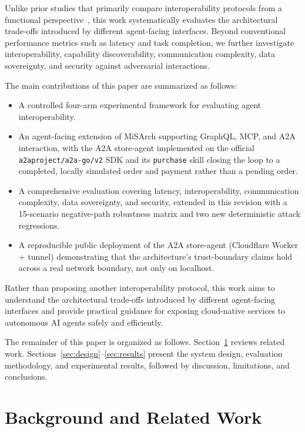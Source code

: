 \documentclass[conference]{IEEEtran}
\begin{document}
Unlike prior studies that primarily compare interoperability protocols from a
functional perspective~\cite{ref2,ref3}, this work systematically evaluates
the architectural trade-offs introduced by different agent-facing interfaces.
Beyond conventional performance metrics such as latency and task completion,
we further investigate interoperability, capability discoverability,
communication complexity, data sovereignty, and security against adversarial
interactions.

The main contributions of this paper are summarized as follows:
\begin{itemize}
\item A controlled four-arm experimental framework for evaluating agent
  interoperability.
\item An agent-facing extension of MiSArch supporting GraphQL, MCP, and A2A
  interaction, with the A2A store-agent implemented on the official
  \texttt{a2aproject/a2a-go/v2} SDK and its \texttt{purchase} skill closing
  the loop to a completed, locally simulated order and payment rather than a
  pending order.
\item A comprehensive evaluation covering latency, interoperability,
  communication complexity, data sovereignty, and security, extended in this
  revision with a 15-scenario negative-path robustness matrix and two new
  deterministic attack regressions.
\item A reproducible public deployment of the A2A store-agent (Cloudflare
  Worker + tunnel) demonstrating that the architecture's trust-boundary
  claims hold across a real network boundary, not only on localhost.
\end{itemize}

Rather than proposing another interoperability protocol, this work aims to
understand the architectural trade-offs introduced by different agent-facing
interfaces and provide practical guidance for exposing cloud-native services
to autonomous AI agents safely and efficiently.

The remainder of this paper is organized as follows. Section~\ref{sec:related}
reviews related work. Sections~\ref{sec:design}--\ref{sec:results} present the
system design, evaluation methodology, and experimental results, followed by
discussion, limitations, and conclusions.

\section{Background and Related Work}
\label{sec:related}
\end{document}
